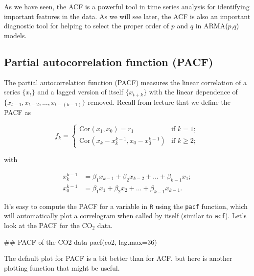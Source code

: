 As we have seen, the ACF is a powerful tool in time series analysis for identifying important features in the data.  As we will see later, the ACF is also an important diagnostic tool for helping to select the proper order of $p$ and $q$ in ARMA($p$,$q$) models.

\subsection{Partial autocorrelation function (PACF)}

The partial autocorrelation function (PACF) measures the linear correlation of a series $\{x_t\}$ and a lagged version of itself $\{x_{t+k}\}$ with the linear dependence of $\{x_{t-1},x_{t-2},\dots,x_{t-(k-1)}\}$ removed.  Recall from lecture that we define the PACF as

\begin{equation}\label{eqn:PACFdefn}
f_k = \begin{cases}
        \text{Cor}(x_1,x_0)=r_1 & \text{if } k = 1;\\
        \text{Cor}(x_k-x_k^{k-1},x_0-x_0^{k-1}) & \text{if } k \geq 2;
      \end{cases}
\end{equation}

with

\begin{subequations}\label{eqn:PACFdefnP2}
  \begin{align}
    x_k^{k-1} &= \beta_1x_{k-1} + \beta_2x_{k-2} + \dots + \beta_{k-1}x_1; \\
    x_0^{k-1} &= \beta_1x_1 + \beta_2x_2 + \dots + \beta_{k-1}x_{k-1}.
  \end{align}
\end{subequations}

It's easy to compute the PACF for a variable in \texttt{R} using the \texttt{pacf} function, which will automatically plot a correlogram when called by itself (similar to \texttt{acf}).  Let's look at the PACF for the CO$_2$ data.

\begin{Schunk}
\begin{Sinput}
 ## PACF of the CO2 data
 pacf(co2, lag.max=36)
\end{Sinput}
\end{Schunk}

The default plot for PACF is a bit better than for ACF, but here is another plotting function that might be useful.

